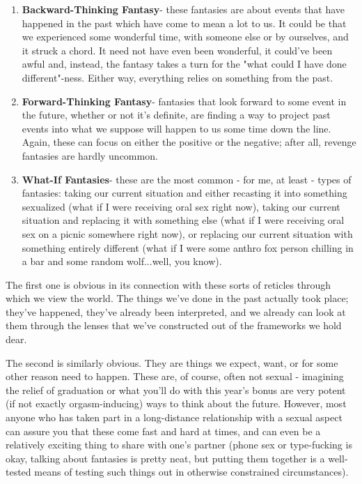 \begin{enumerate}
\tightlist
\item
  \textbf{Backward-Thinking Fantasy}- these fantasies are about events that have happened in the past which have come to mean a lot to us. It could be that we experienced some wonderful time, with someone else or by ourselves, and it struck a chord. It need not have even been wonderful, it could've been awful and, instead, the fantasy takes a turn for the "what could I have done different"-ness. Either way, everything relies on something from the past.
\item
  \textbf{Forward-Thinking Fantasy}- fantasies that look forward to some event in the future, whether or not it's definite, are finding a way to project past events into what we suppose will happen to us some time down the line. Again, these can focus on either the positive or the negative; after all, revenge fantasies are hardly uncommon.
\item
  \textbf{What-If Fantasies}- these are the most common - for me, at least - types of fantasies: taking our current situation and either recasting it into something sexualized (what if I were receiving oral sex right now), taking our current situation and replacing it with something else (what if I were receiving oral sex on a picnic somewhere right now), or replacing our current situation with something entirely different (what if I were some anthro fox person chilling in a bar and some random wolf...well, you know).
\end{enumerate}

The first one is obvious in its connection with these sorts of reticles through which we view the world. The things we've done in the past actually took place; they've happened, they've already been interpreted, and we already can look at them through the lenses that we've constructed out of the frameworks we hold dear.

The second is similarly obvious. They are things we expect, want, or for some other reason need to happen. These are, of course, often not sexual - imagining the relief of graduation or what you'll do with this year's bonus are very potent (if not exactly orgasm-inducing) ways to think about the future. However, most anyone who has taken part in a long-distance relationship with a sexual aspect can assure you that these come fast and hard at times, and can even be a relatively exciting thing to share with one's partner (phone sex or type-fucking is okay, talking about fantasies is pretty neat, but putting them together is a well-tested means of testing such things out in otherwise constrained circumstances).

